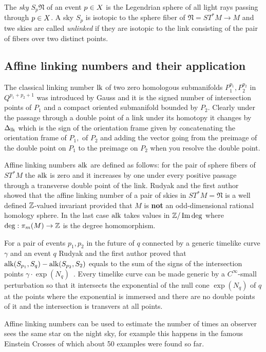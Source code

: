 \documentclass[12pt,reqno,a4paper]{amsart}
\begin{document}
The {\em sky} $S_p\mathfrak N$ of an event $p\in \ss$ is the Legendrian sphere of all light rays passing through $p\in \ss$. A sky $S_p$ is isotopic to the sphere fiber of $\mathfrak N=ST^*M\to M$ and twe skies are called {\em unlinked \/}if they are isotopic to the link consisting of the pair of fibers over two distinct  points.


\subsection{Affine linking numbers and their application }
The classical linking number $\lk$ of two zero homologous submanifolds $P_1^{p_1}, P_2^{p_2}$ in $Q^{p_1+p_2+1}$ was introduced by Gauss and it is the signed number of intersection points of $P_1$ and a compact oriented submanifold bounded by $P_2.$ Clearly under the passage through a double point of a link under its homotopy it changes by $\Delta_{\lk}$ which is the sign of the orientation frame given by concatenating the orientation frame of $P_1,$ of $ P_2$ and adding the vector going from the preimage of the double point on $P_1$ to the preimage on $P_2$ when you resolve the double point. 

Affine linking numbers $\alk$ are defined as follows: for the pair of sphere fibers of $ST^*M$ the $\alk$ is zero and it increases by one under every positive passage through a transverse double point of the link. Rudyak and the first author~\cite{ChernovRudyak} showed that the affine linking number of a pair of skies in $ST^*M=\mathfrak N$ is a well defined $\Z$-valued invariant provided that $M$ is {\bf not} an odd-dimensional rational homology sphere. In the last case $\alk$ takes values in $\Z/\Im \deg$ where $\deg:\pi_m(M)\to \Z$ is the degree homomorphism.

For a pair of events $p_1, p_2$ in the future of $q$ connected by a generic timelike curve $\gamma$ and an event $q$  Rudyak and the first author proved that $\alk(S_{p_1}, S_q)-\alk(S_{p_2}, S_2)$ equals to the sum of the signs of the intersection points $\gamma\cdot\exp(N_q)$~\cite{ChernovRudyak}. Every timelike curve can be made generic by a $C^{\infty}$-small perturbation so that it intersects the exponential of the null cone $\exp(N_q)$ of $q$ at the points where the exponential is immersed and there are no double points of it and the intersection is transvers at all points.


Affine linking numbers can be used to estimate the number of times an observer sees the same star on the night sky, for example this happens in the famous Einstein Crosses of which about 50 examples were found so far.
\end{document}
